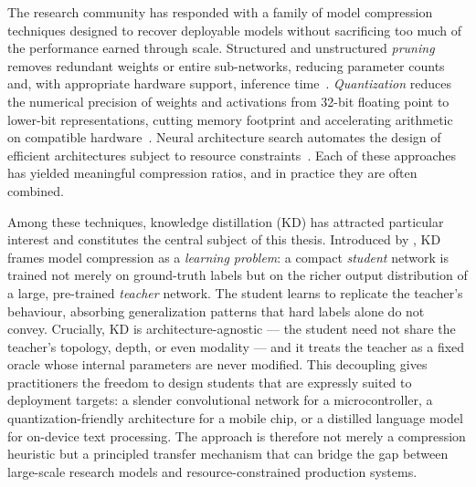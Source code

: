 \begin{foldable}
  The research community has responded with a family of model compression techniques designed to recover deployable models without sacrificing too much of the performance earned through scale.
  Structured and unstructured \emph{pruning} removes redundant weights or entire sub-networks, reducing parameter counts and, with appropriate hardware support, inference time~\cite{han2015learning,molchanov2016pruning}.
  \emph{Quantization} reduces the numerical precision of weights and activations from 32-bit floating point to lower-bit representations, cutting memory footprint and accelerating arithmetic on compatible hardware~\cite{hubara2018quantized,jacob2018quantization}.
  Neural architecture search automates the design of efficient architectures subject to resource constraints~\cite{zoph2018learning,tan2019mnasnet}.
  Each of these approaches has yielded meaningful compression ratios, and in practice they are often combined.
\end{foldable}

\begin{foldable}
  Among these techniques, knowledge distillation (\ac{KD}) has attracted particular interest and constitutes the central subject of this thesis.
  Introduced by \cite{hinton2015distilling}, \ac{KD} frames model compression as a \emph{learning problem}: a compact \emph{student} network is trained not merely on ground-truth labels but on the richer output distribution of a large, pre-trained \emph{teacher} network.
  The student learns to replicate the teacher's behaviour, absorbing generalization patterns that hard labels alone do not convey.
  Crucially, \ac{KD} is architecture-agnostic — the student need not share the teacher's topology, depth, or even modality — and it treats the teacher as a fixed oracle whose internal parameters are never modified.
  This decoupling gives practitioners the freedom to design students that are expressly suited to deployment targets: a slender convolutional network for a microcontroller, a quantization-friendly architecture for a mobile chip, or a distilled language model for on-device text processing.
  The approach is therefore not merely a compression heuristic but a principled transfer mechanism that can bridge the gap between large-scale research models and resource-constrained production systems.
\end{foldable}

